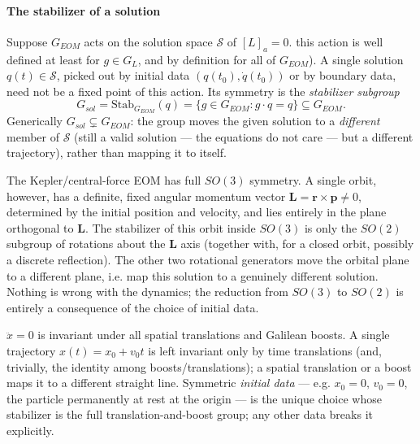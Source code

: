\paragraph{The stabilizer of a solution}
Suppose $G_{EOM}$ acts on the solution space $\mathcal S$ of $[L]_a=0$.
 this action is well defined at least for
$g\in G_L$, and by definition for all of $G_{EOM}$). A single solution
$q(t)\in\mathcal S$, picked out by initial data $(q(t_0),\dot q(t_0))$ or by
boundary data, need not be a fixed point of this action. Its symmetry is the
\emph{stabilizer subgroup}
\[
    G_{sol}=\mathrm{Stab}_{G_{EOM}}(q) = \{ g\in G_{EOM} : g\cdot q
    = q \} \subseteq G_{EOM} .
\]
Generically $G_{sol} \subsetneq G_{EOM}$: the group moves the given
solution to a \emph{different} member of $\mathcal S$ (still a valid solution —
the equations do not care — but a different trajectory), rather than mapping it
to itself.

\begin{example}
The Kepler/central-force EOM has full $SO(3)$ symmetry.
     A single
    orbit, however, has a definite, fixed angular momentum vector $\bm L = \bm
    r\times\bm p\neq 0$, determined by the initial position and velocity, and
    lies entirely in the plane orthogonal to $\bm L$. The stabilizer of this
    orbit inside $SO(3)$ is only the $SO(2)$ subgroup of rotations about the
    $\bm L$ axis (together with, for a closed orbit, possibly a discrete
    reflection). The other two rotational generators move the orbital plane to
    a different plane, i.e. map this solution to a genuinely different
    solution. Nothing is wrong with the dynamics; the reduction from $SO(3)$ to
    $SO(2)$ is entirely a consequence of the choice of initial data.
\end{example}

\begin{example}
$\ddot x=0$ is invariant under all spatial translations and Galilean boosts. A
    single trajectory $x(t)=x_0+v_0t$ is left invariant only by time
    translations (and, trivially, the identity among boosts/translations); a
    spatial translation or a boost maps it to a different straight line.
    Symmetric \emph{initial data} — e.g. $x_0=0,\,v_0=0$, the particle
    permanently at rest at the origin — is the unique choice whose stabilizer
    is the full translation-and-boost group; any other data breaks it
    explicitly.
\end{example}

